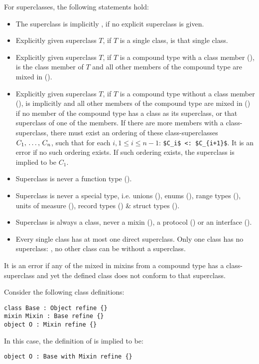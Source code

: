 For superclasses, the following statements hold:
\begin{itemize}
\item The superclass is implicitly , if no explicit superclass is given. 
\item Explicitly given superclass $T$, if $T$ is a single class, is that single class. 
\item Explicitly given superclass $T$, if $T$ is a compound type with a class member (), is the class member of $T$ and all other members of the compound type are mixed in (). 
\item Explicitly given superclass $T$, if $T$ is a compound type without a class member (), is implicitly  and all other members of the compound type are mixed in () if no member of the compound type has a class as its superclass, or that superclass of one of the members. If there are more members with a class-superclass, there must exist an ordering of these class-superclasses $C_1 ,\, \ldots ,\, C_n$, such that for each $i, 1 \le i \le n-1$: \lstinline!$C_i$ <: $C_{i+1}$!. It is an error if no such ordering exists. If such ordering exists, the superclass is implied to be $C_1$. 
\item Superclass is never a function type (). 
\item Superclass is never a special type, i.e. unions (), enums (), range types (), units of measure (), record types () \& struct types (). 
\item Superclass is always a class, never a mixin (), a protocol () or an interface (). 
\item Every single class has at most one direct superclass. Only one class has no superclass: , no other class can be without a superclass. 
\end{itemize}

It is an error if any of the mixed in mixins from a compound type has a class-superclass and yet the defined class does not conform to that superclass. 

\example Consider the following class definitions:
\begin{lstlisting}
class Base : Object refine {}
mixin Mixin : Base refine {}
object O : Mixin refine {}
\end{lstlisting}
In this case, the definition of  is implied to be:
\begin{lstlisting}
object O : Base with Mixin refine {}
\end{lstlisting}

